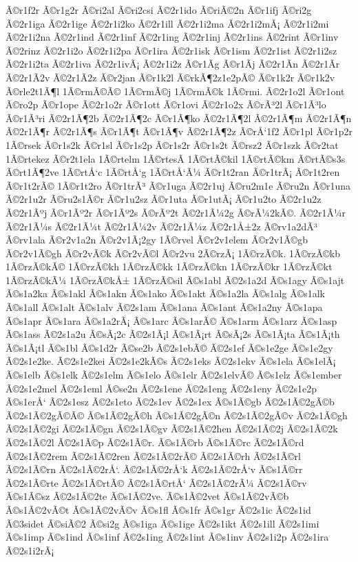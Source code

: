 {Ã©r1f2r
Ã©r1g2r
Ã©ri2al
Ã©ri2csi
Ã©2r1ido
Ã©riÃ©2n
Ã©r1ifj
Ã©ri2g
Ã©2r1iga
Ã©2r1ige
Ã©2r1i2ko
Ã©2r1ill
Ã©2r1i2ma
Ã©2r1i2mÃ¡
Ã©2r1i2mi
Ã©2r1i2na
Ã©2r1ind
Ã©2r1inf
Ã©2r1ing
Ã©2r1inj
Ã©2r1ins
Ã©2rint
Ã©r1inv
Ã©2rinz
Ã©2r1i2o
Ã©2r1i2pa
Ã©r1ira
Ã©2r1isk
Ã©r1ism
Ã©2r1ist
Ã©2r1i2sz
Ã©2r1i2ta
Ã©2r1iva
Ã©2r1ivÃ¡
Ã©2r1i2z
Ã©r1Ã­g
Ã©r1Ã­j
Ã©2r1Ã­n
Ã©2r1Ã­r
Ã©2r1Ã­2v
Ã©2r1Ã­2z
Ã©r2jan
Ã©r1k2l
Ã©rkÃ¶2z1e2pÃ©
Ã©r1k2r
Ã©r1k2v
Ã©rle2t1Ã¶l
1Ã©rmÃ©Ã©
1Ã©rmÃ©j
1Ã©rmÃ©k
1Ã©rmi.
Ã©2r1o2l
Ã©r1ont
Ã©ro2p
Ã©r1ope
Ã©2r1o2r
Ã©r1ott
Ã©r1ovi
Ã©2r1o2x
Ã©rÃ³2l
Ã©r1Ã³lo
Ã©r1Ã³ri
Ã©2r1Ã¶2b
Ã©2r1Ã¶2c
Ã©r1Ã¶ko
Ã©2r1Ã¶2l
Ã©2r1Ã¶m
Ã©2r1Ã¶n
Ã©2r1Ã¶r
Ã©2r1Ã¶s
Ã©r1Ã¶t
Ã©r1Ã¶v
Ã©2r1Ã¶2z
Ã©rÅ‘1f2
Ã©r1pl
Ã©r1p2r
1Ã©rsek
Ã©r1s2k
Ã©r1sl
Ã©r1s2p
Ã©r1s2r
Ã©r1s2t
Ã©rsz2
Ã©r1szk
Ã©r2tat
1Ã©rtekez
Ã©r2t1ela
1Ã©rtelm
1Ã©rtesÃ­
1Ã©rtÃ©kil
1Ã©rtÃ©km
Ã©rtÃ©s3s
Ã©rt1Ã¶2ve
1Ã©rtÅ‘c
1Ã©rtÅ‘g
1Ã©rtÅ‘Ã¼
Ã©r1t2ran
Ã©r1trÃ¡
Ã©r1t2ren
Ã©r1t2rÃ©
1Ã©r1t2ro
Ã©r1trÃ³
Ã©r1uga
Ã©2r1uj
Ã©ru2m1e
Ã©ru2n
Ã©r1una
Ã©2r1u2r
Ã©ru2s1Ã©r
Ã©r1u2sz
Ã©r1uta
Ã©r1utÃ¡
Ã©r1u2to
Ã©2r1u2z
Ã©2r1Ãºj
Ã©r1Ãº2r
Ã©r1Ãº2s
Ã©rÃº2t
Ã©2r1Ã¼2g
Ã©rÃ¼2kÃ©.
Ã©2r1Ã¼r
Ã©2r1Ã¼s
Ã©2r1Ã¼t
Ã©2r1Ã¼2v
Ã©2r1Ã¼z
Ã©2r1Å±2z
Ã©rv1a2dÃ³
Ã©rv1ala
Ã©r2v1a2n
Ã©r2v1Ã¡2gy
1Ã©rvel
Ã©r2v1elem
Ã©r2v1Ã©gb
Ã©r2v1Ã©gh
Ã©r2vÃ©k
Ã©r2vÃ©l
Ã©r2vu
2Ã©rzÃ¡
1Ã©rzÃ©k.
1Ã©rzÃ©kb
1Ã©rzÃ©kÃ©
1Ã©rzÃ©kh
1Ã©rzÃ©kk
1Ã©rzÃ©kn
1Ã©rzÃ©kr
1Ã©rzÃ©kt
1Ã©rzÃ©kÃ¼
1Ã©rzÃ©kÅ±
1Ã©rzÃ©sil
Ã©s1abl
Ã©2s1a2d
Ã©s1agy
Ã©s1ajt
Ã©s1a2ka
Ã©s1akl
Ã©s1akn
Ã©s1ako
Ã©s1akt
Ã©s1a2la
Ã©s1alg
Ã©s1alk
Ã©s1all
Ã©s1alt
Ã©s1alv
Ã©2s1am
Ã©s1ana
Ã©s1ant
Ã©s1a2ny
Ã©s1apa
Ã©s1apr
Ã©s1ara
Ã©s1a2rÃ¡
Ã©s1arc
Ã©s1arÃ©
Ã©s1arm
Ã©s1arz
Ã©s1asp
Ã©s1ass
Ã©2s1a2u
Ã©sÃ¡2c
Ã©2s1Ã¡l
Ã©s1Ã¡rt
Ã©sÃ¡2s
Ã©s1Ã¡ta
Ã©s1Ã¡th
Ã©s1Ã¡tl
Ã©s1bl
Ã©s1d2r
Ã©se2b
Ã©2s1ebÃ©
Ã©2s1ef
Ã©s1e2ge
Ã©s1e2gy
Ã©2s1e2ke.
Ã©2s1e2kei
Ã©2s1e2kÃ©s
Ã©2s1eks
Ã©2s1ekv
Ã©s1ela
Ã©s1elÃ¡
Ã©s1elb
Ã©s1elk
Ã©2s1elm
Ã©s1elo
Ã©s1elr
Ã©2s1elvÃ©
Ã©s1elz
Ã©s1ember
Ã©2s1e2mel
Ã©2s1eml
Ã©se2n
Ã©2s1ene
Ã©2s1eng
Ã©2s1eny
Ã©2s1e2p
Ã©s1erÅ‘
Ã©2s1esz
Ã©2s1eto
Ã©2s1ev
Ã©2s1ex
Ã©s1Ã©gb
Ã©2s1Ã©2gÃ©b
Ã©2s1Ã©2gÃ©Ã©
Ã©s1Ã©2gÃ©h
Ã©s1Ã©2gÃ©n
Ã©2s1Ã©2gÃ©v
Ã©2s1Ã©gh
Ã©2s1Ã©2gi
Ã©2s1Ã©gn
Ã©2s1Ã©gv
Ã©2s1Ã©2hen
Ã©2s1Ã©2j
Ã©2s1Ã©2k
Ã©2s1Ã©2l
Ã©2s1Ã©p
Ã©2s1Ã©r.
Ã©s1Ã©rb
Ã©s1Ã©rc
Ã©2s1Ã©rd
Ã©2s1Ã©2rem
Ã©2s1Ã©2ren
Ã©2s1Ã©2rÃ©
Ã©2s1Ã©rh
Ã©2s1Ã©rl
Ã©2s1Ã©rn
Ã©2s1Ã©2rÅ‘.
Ã©2s1Ã©2rÅ‘k
Ã©2s1Ã©2rÅ‘v
Ã©s1Ã©rr
Ã©2s1Ã©rte
Ã©2s1Ã©rtÃ©
Ã©2s1Ã©rtÅ‘
Ã©2s1Ã©2rÃ¼
Ã©2s1Ã©rv
Ã©s1Ã©sz
Ã©2s1Ã©2te
Ã©s1Ã©2ve.
Ã©s1Ã©2vet
Ã©s1Ã©2vÃ©b
Ã©s1Ã©2vÃ©t
Ã©s1Ã©2vÃ©v
Ã©s1fl
Ã©s1fr
Ã©s1gr
Ã©2s1ic
Ã©2s1id
Ã©3sidet
Ã©siÃ©2
Ã©si2g
Ã©s1iga
Ã©s1ige
Ã©2s1ikt
Ã©2s1ill
Ã©2s1imi
Ã©s1imp
Ã©s1ind
Ã©s1inf
Ã©2s1ing
Ã©2s1int
Ã©s1inv
Ã©2s1i2p
Ã©2s1ira
Ã©2s1i2rÃ¡
}
